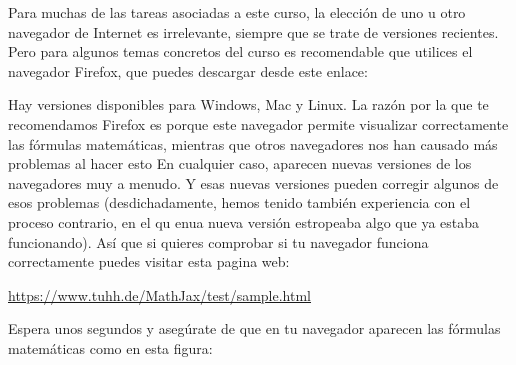 \documentclass[10pt,a4paper]{article}\usepackage[]{graphicx}\usepackage[]{color}
\newcounter {cont01}
\begin{document}
Para muchas de las tareas asociadas a este curso, la elección de uno u otro navegador de Internet
es irrelevante, siempre que se trate de versiones recientes. Pero para algunos temas concretos del curso es 
recomendable que utilices el navegador Firefox, que puedes descargar desde  este enlace:
\begin{center}
\end{center}
Hay versiones disponibles para Windows, Mac y Linux. La razón por la que te recomendamos Firefox es
porque este navegador permite visualizar correctamente las fórmulas matemáticas, mientras que otros 
navegadores nos han causado más problemas al hacer esto
En cualquier caso, aparecen nuevas versiones de los navegadores muy a menudo. Y esas nuevas versiones pueden corregir algunos de esos problemas (desdichadamente, hemos tenido también experiencia con el proceso contrario, en el qu enua nueva versión estropeaba algo que ya estaba funcionando). Así que si quieres comprobar si tu navegador funciona correctamente puedes visitar esta pagina web: 
\begin{center}
\href{https://www.tuhh.de/MathJax/test/sample.html}{https://www.tuhh.de/MathJax/test/sample.html}
\end{center}
Espera unos segundos y asegúrate de que en tu navegador aparecen las fórmulas matemáticas como en esta figura:
\end{document}
